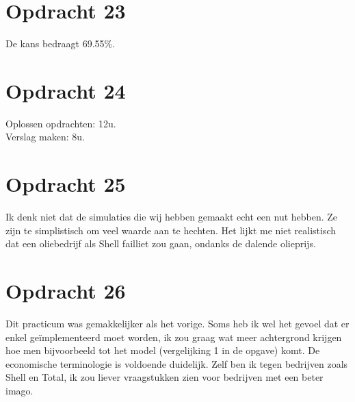 \documentclass[11pt,a4paper]{article}
\begin{document}


\section*{Opdracht 23}

De kans bedraagt 69.55\%.



\section*{Opdracht 24}

Oplossen opdrachten: 12u.\\
Verslag maken: 8u.

\section*{Opdracht 25}

Ik denk niet dat de simulaties die wij hebben gemaakt echt een nut hebben. Ze zijn te simplistisch om veel waarde aan te hechten. 
Het lijkt me niet realistisch dat een oliebedrijf als Shell failliet zou gaan, ondanks de dalende olieprijs. 

\section*{Opdracht 26}
Dit practicum was gemakkelijker als het vorige. Soms heb ik wel het gevoel dat er enkel geïmplementeerd moet worden, ik zou graag wat meer achtergrond krijgen hoe men bijvoorbeeld tot het model (vergelijking 1 in de opgave) komt.
De economische terminologie is voldoende duidelijk.
Zelf ben ik tegen bedrijven zoals Shell en Total, ik zou liever vraagstukken zien voor bedrijven met een beter imago.
\end{document}
